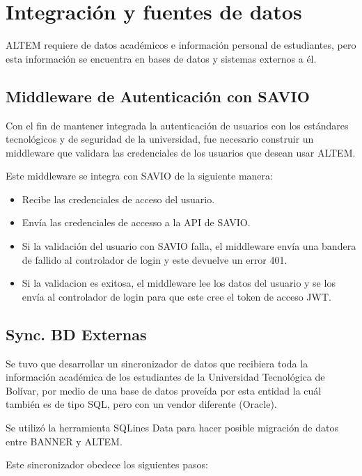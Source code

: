 \chapter{Integración y fuentes de datos}
ALTEM requiere de datos académicos e información personal de estudiantes, pero esta información se encuentra en bases de datos y sistemas externos a él.

\section{Middleware de Autenticación con SAVIO}
Con el fin de mantener integrada la autenticación de usuarios con los estándares tecnológicos y de seguridad de la universidad, fue necesario construir un middleware que validara las credenciales de los usuarios que desean usar ALTEM.

Este middleware se integra con SAVIO de la siguiente manera:
\begin{itemize}
    \item Recibe las credenciales de acceso del usuario.
    \item Envía las credenciales de accesso a la API de SAVIO.
    \item Si la validación del usuario con SAVIO falla, el middleware envía una bandera de fallido al controlador de login y este devuelve un error 401.
    \item Si la validacion es exitosa, el middleware lee los datos del usuario y se los envía al controlador de login para que este cree el token de acceso JWT.
\end{itemize}

\section{Sync. BD Externas}
Se tuvo que desarrollar un sincronizador de datos que recibiera toda la información académica de los estudiantes de la Universidad Tecnológica de Bolívar, por medio de una base de datos proveída por esta entidad la cuál también es de tipo SQL, pero con un vendor diferente (Oracle).

Se utilizó la herramienta SQLines Data para hacer posible migración de datos entre BANNER y ALTEM. 

Este sincronizador obedece los siguientes pasos:

